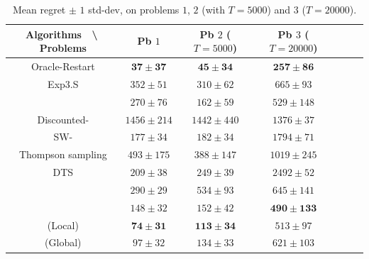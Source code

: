 \begin{table}[ht]
    \centering
    \begin{tabular}{c|cccccc}
    \textbf{Algorithms} $\;$ \textbackslash $\;$ \textbf{Problems} & Pb $1$ & Pb $2$ ($T=5000$) & Pb $3$ ($T=20000$) \\
        \hline
        Oracle-Restart \klUCB{} & $\mathbf{37 \pm 37}$ & $\mathbf{45 \pm 34}$ & $\mathbf{257 \pm 86}$ \\
        \hline
        Exp3.S & $352 \pm 51$ & $310 \pm 62$ & $665 \pm 93$ \\
        \hline
        \klUCB{} & $270 \pm 76$ & $162 \pm 59$ & $529 \pm 148$ \\
        Discounted-\klUCB{} & $1456 \pm 214$ & $1442 \pm 440$ & $1376 \pm 37$ \\
        SW-\klUCB{} & $177 \pm 34$ & $182 \pm 34$ & $1794 \pm 71$ \\
        \hline
        Thompson sampling & $493 \pm 175$ & $388 \pm 147$ & $1019 \pm 245$ \\
        DTS & $209 \pm 38$ & $249 \pm 39$ & $2492 \pm 52$ \\
        \hline
        \MklUCB{} & $290 \pm 29$ & $534 \pm 93$ & $645 \pm 141$ \\
        \CUSUMklUCB{} & $148 \pm 32$ & $152 \pm 42$ & $\mathbf{490 \pm 133}$ \\
        \hline
        \GLRklUCB{}(Local) & $\mathbf{74 \pm 31}$ & $\mathbf{113 \pm 34}$ & $513 \pm 97$ \\
        \GLRklUCB{}(Global) & $97 \pm 32$ & $134 \pm 33$ & $621 \pm 103$
    \end{tabular}
    \caption{Mean regret $\pm$ $1$ std-dev, on problems $1$, $2$ (with $T=5000$) and $3$ ($T=20000$).
    }
    \label{table:6:totalResults1}
\end{table}

